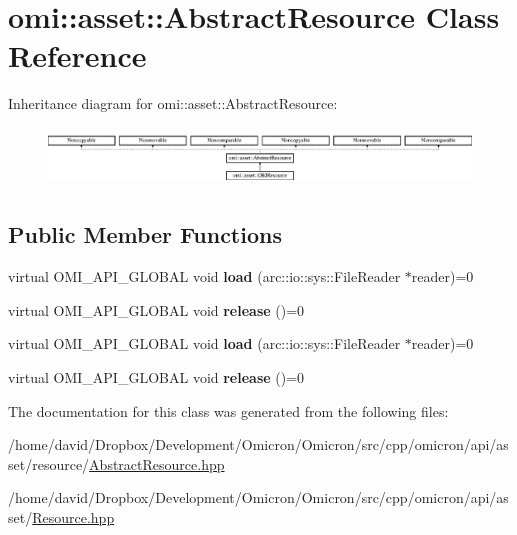 \hypertarget{classomi_1_1asset_1_1_abstract_resource}{}\section{omi\+:\+:asset\+:\+:Abstract\+Resource Class Reference}
\label{classomi_1_1asset_1_1_abstract_resource}
Inheritance diagram for omi\+:\+:asset\+:\+:Abstract\+Resource\+:\begin{figure}[H]
\begin{center}
\leavevmode
\includegraphics[height=1.546961cm]{classomi_1_1asset_1_1_abstract_resource}
\end{center}
\end{figure}
\subsection*{Public Member Functions}
\begin{DoxyCompactItemize}
\item 
virtual O\+M\+I\+\_\+\+A\+P\+I\+\_\+\+G\+L\+O\+B\+AL void {\bfseries load} (arc\+::io\+::sys\+::\+File\+Reader $\ast$reader)=0\hypertarget{classomi_1_1asset_1_1_abstract_resource_a02cc704cd296f2488fe365482d9831c4}{}\label{classomi_1_1asset_1_1_abstract_resource_a02cc704cd296f2488fe365482d9831c4}

\item 
virtual O\+M\+I\+\_\+\+A\+P\+I\+\_\+\+G\+L\+O\+B\+AL void {\bfseries release} ()=0\hypertarget{classomi_1_1asset_1_1_abstract_resource_ace554a5703b61f7ebf3ba67273093671}{}\label{classomi_1_1asset_1_1_abstract_resource_ace554a5703b61f7ebf3ba67273093671}

\item 
virtual O\+M\+I\+\_\+\+A\+P\+I\+\_\+\+G\+L\+O\+B\+AL void {\bfseries load} (arc\+::io\+::sys\+::\+File\+Reader $\ast$reader)=0\hypertarget{classomi_1_1asset_1_1_abstract_resource_a02cc704cd296f2488fe365482d9831c4}{}\label{classomi_1_1asset_1_1_abstract_resource_a02cc704cd296f2488fe365482d9831c4}

\item 
virtual O\+M\+I\+\_\+\+A\+P\+I\+\_\+\+G\+L\+O\+B\+AL void {\bfseries release} ()=0\hypertarget{classomi_1_1asset_1_1_abstract_resource_ace554a5703b61f7ebf3ba67273093671}{}\label{classomi_1_1asset_1_1_abstract_resource_ace554a5703b61f7ebf3ba67273093671}

\end{DoxyCompactItemize}


The documentation for this class was generated from the following files\+:\begin{DoxyCompactItemize}
\item 
/home/david/\+Dropbox/\+Development/\+Omicron/\+Omicron/src/cpp/omicron/api/asset/resource/\hyperlink{_abstract_resource_8hpp}{Abstract\+Resource.\+hpp}\item 
/home/david/\+Dropbox/\+Development/\+Omicron/\+Omicron/src/cpp/omicron/api/asset/\hyperlink{_resource_8hpp}{Resource.\+hpp}\end{DoxyCompactItemize}
